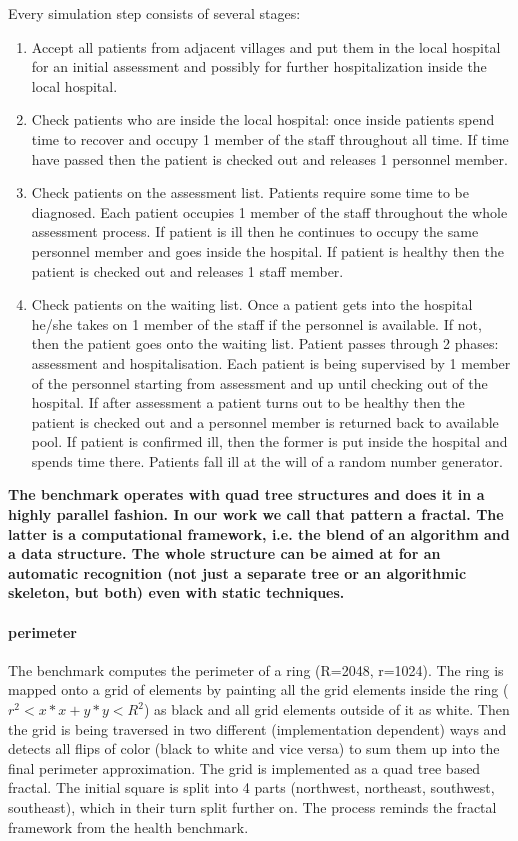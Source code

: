 Every simulation step consists of several stages:
\begin{enumerate}
  \item Accept all patients from adjacent villages and put them in the local hospital for an initial assessment and possibly for further hospitalization inside the local hospital.
  \item Check patients who are inside the local hospital: once inside patients spend time to recover and occupy 1 member of the staff throughout all time. If time have passed then the patient is checked out and releases 1 personnel member.
  \item Check patients on the assessment list. Patients require some time to be diagnosed. Each patient occupies 1 member of the staff throughout the whole assessment process. If patient is ill then he continues to occupy the same personnel member and goes inside the hospital. If patient is healthy then the patient is checked out and releases 1 staff member.
  \item Check patients on the waiting list. Once a patient gets into the hospital he/she takes on 1 member of the staff if the personnel is available. If not, then the patient goes onto the waiting list. Patient passes through 2 phases: assessment and hospitalisation. Each patient is being supervised by 1 member of the personnel starting from assessment and up until checking out of the hospital. If after assessment a patient turns out to be healthy then the patient is checked out and a personnel member is returned back to available pool. If patient is confirmed ill, then the former is put inside the hospital and spends time there. Patients fall ill at the will of a random number generator.
\end{enumerate}

\textbf{The benchmark operates with quad tree structures and does it in a highly parallel fashion. In our work we call that pattern a fractal. The latter is a computational framework, i.e. the blend of an algorithm and a data structure. The whole structure can be aimed at for an automatic recognition (not just a separate tree or an algorithmic skeleton, but both) even with static techniques.}

\paragraph{perimeter} The benchmark computes the perimeter of a ring (R=2048, r=1024). The ring is mapped onto a grid of elements by painting all the grid elements inside the ring ($r^{2} < x*x + y*y < R^{2}$) as black and all grid elements outside of it as white. Then the grid is being traversed in two different (implementation dependent) ways and detects all flips of color (black to white and vice versa) to sum them up into the final perimeter approximation. The grid is implemented as a quad tree based fractal. The initial square is split into 4 parts (northwest, northeast, southwest, southeast), which in their turn split further on. The process reminds the fractal framework from the health benchmark.  

